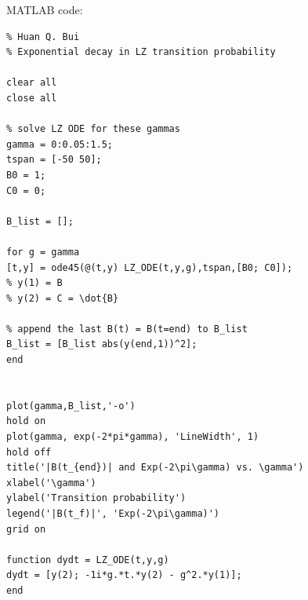 \documentclass{article}
\theoremstyle{definition}
\begin{document}
MATLAB code:
\begin{lstlisting}
% Huan Q. Bui
% Exponential decay in LZ transition probability

clear all
close all

% solve LZ ODE for these gammas
gamma = 0:0.05:1.5;
tspan = [-50 50];
B0 = 1;
C0 = 0;

B_list = [];

for g = gamma
[t,y] = ode45(@(t,y) LZ_ODE(t,y,g),tspan,[B0; C0]);
% y(1) = B
% y(2) = C = \dot{B}

% append the last B(t) = B(t=end) to B_list
B_list = [B_list abs(y(end,1))^2];
end


plot(gamma,B_list,'-o')
hold on
plot(gamma, exp(-2*pi*gamma), 'LineWidth', 1)
hold off
title('|B(t_{end})| and Exp(-2\pi\gamma) vs. \gamma')
xlabel('\gamma')
ylabel('Transition probability')
legend('|B(t_f)|', 'Exp(-2\pi\gamma)')
grid on

function dydt = LZ_ODE(t,y,g)
dydt = [y(2); -1i*g.*t.*y(2) - g^2.*y(1)];
end

\end{lstlisting}



 
	
\end{document}
